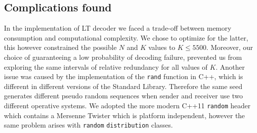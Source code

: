 \subsection{Complications found}
In the implementation of LT decoder we faced a trade-off between memory consumption and computational complexity. We chose to optimize for the latter, this however constrained the possible $N$ and $K$ values to $K \le 5500$. Moreover, our choice of guaranteeing a low probability of decoding failure, prevented us from exploring the same intervals of relative redundancy for all values of $K$. Another issue was caused by the implementation of the \texttt{rand} function in C++, which is different in different versions of the Standard Library. Therefore the same seed generates different pseudo random sequences when sender and receiver use two different operative systems. We adopted the more modern C++11 \texttt{random} header which contains a Mersenne Twister which is platform independent, however the same problem arises with \texttt{random} \texttt{distribution} classes.


